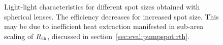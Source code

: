 \begin{figure}
\centering
{}
\caption{Light-light characteristics
for different spot sizes
obtained with spherical lenses.
The efficiency decreases
for increased spot size.
This may be due to
inefficient heat extraction
manifested in sub-area scaling of $R_\mathrm{th}$,
discussed in section~\ref{sec:eval:pumpspot:rth}.}
\label{img:LL_spot_scaling}
\end{figure}

